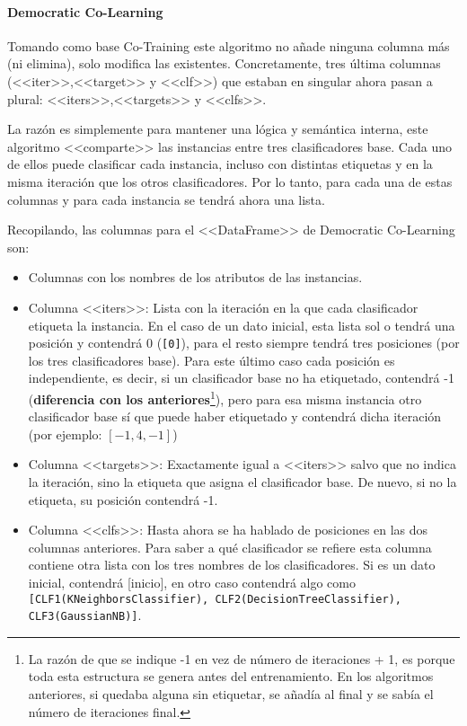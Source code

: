 \paragraph{Democratic Co-Learning}
Tomando como base Co-Training este algoritmo no añade ninguna columna más (ni
elimina), solo modifica las existentes. Concretamente, tres última columnas
(<<iter>>,<<target>> y <<clf>>) que estaban en singular ahora pasan a plural:
<<iters>>,<<targets>> y <<clfs>>. 

La razón es simplemente para mantener una lógica y semántica interna, este
algoritmo <<comparte>> las instancias entre tres clasificadores base. Cada uno
de ellos puede clasificar cada instancia, incluso con distintas etiquetas y en
la misma iteración que los otros clasificadores. Por lo tanto, para cada una de
estas columnas y para cada instancia se tendrá ahora una lista.

Recopilando, las columnas para el <<DataFrame>> de Democratic Co-Learning son:

\begin{itemize}
    \item Columnas con los nombres de los atributos de las instancias.
    \item Columna <<iters>>: Lista con la iteración en la que cada clasificador
    etiqueta la instancia. En el caso de un dato inicial, esta lista sol o
    tendrá una posición y contendrá 0 (\texttt{[0]}), para el resto siempre
    tendrá tres posiciones (por los tres clasificadores base). Para este último
    caso cada posición es independiente, es decir, si un clasificador base no ha
    etiquetado, contendrá -1 (\textbf{diferencia con los anteriores}\footnote{La
    razón de que se indique -1 en vez de número de iteraciones + 1, es porque
    toda esta estructura se genera antes del entrenamiento. En los algoritmos
    anteriores, si quedaba alguna sin etiquetar, se añadía al final y se sabía
    el número de iteraciones final.}), pero para esa misma instancia otro
    clasificador base sí que puede haber etiquetado y contendrá dicha iteración
    (por ejemplo: $[-1,4,-1]$)
    \item Columna <<targets>>: Exactamente igual a <<iters>> salvo que no indica
    la iteración, sino la etiqueta que asigna el clasificador base. De nuevo, si
    no la etiqueta, su posición contendrá -1.
    \item Columna <<clfs>>: Hasta ahora se ha hablado de posiciones en las dos
    columnas anteriores. Para saber a qué clasificador se refiere esta columna
    contiene otra lista con los tres nombres de los clasificadores. Si es un
    dato inicial, contendrá [inicio], en otro caso contendrá algo como
    \texttt{[CLF1(KNeighborsClassifier), CLF2(DecisionTreeClassifier),
    CLF3(GaussianNB)]}.
\end{itemize}


